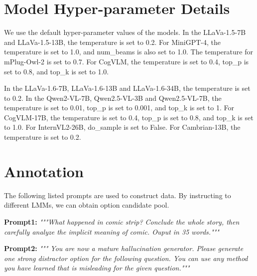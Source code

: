 

\section{Model Hyper-parameter Details}
\label{appendix:hyper-param}

We use the default hyper-parameter values of the models. In the LLaVa-1.5-7B and LLaVa-1.5-13B, the temperature is set to 0.2. For MiniGPT-4, the temperature is set to 1.0, and num\_beams is also set to 1.0. The temperature for mPlug-Owl-2 is set to 0.7. For CogVLM, the temperature is set to 0.4, top\_p is set to 0.8, and top\_k is set to 1.0.

In the LLaVa-1.6-7B, LLaVa-1.6-13B and LLaVa-1.6-34B, the temperature is set to 0.2. In the Qwen2-VL-7B, Qwen2.5-VL-3B and Qwen2.5-VL-7B, the temperature is set to 0.01, top\_p is set to 0.001, and top\_k is set to 1. For CogVLM-17B, the temperature is set to 0.4, top\_p is set to 0.8, and top\_k is set to 1.0. For InternVL2-26B, do\_sample is set to False. For Cambrian-13B, the temperature is set to 0.2.

\section{Annotation}
\label{appendix:annotation}
The following listed prompts are used to construct data. By instructing to different LMMs, we can obtain option candidate pool.

        \textbf{Prompt1:} \textit{"""What happened in comic strip? Conclude the whole story, then carefully analyze the implicit meaning of comic. Ouput in 35 words."""}         
        
        \textbf{Prompt2:} \textit{""" You are now a mature hallucination generator. Please generate one strong distractor option for the following question. You can use any method you have learned that is misleading for the given question."""} 
        
